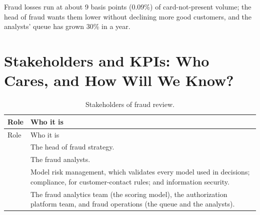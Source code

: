 Fraud losses run at about 9 basis points (0.09\%) of card-not-present volume; the head of fraud wants them lower without declining more good customers, and the analysts' queue has grown 30\% in a year.

\section{Stakeholders and KPIs: Who Cares, and How Will We Know?}
\label{sec:fr-kpis}

\begingroup
\small
\begin{xltabular}{\textwidth}{@{}>{\raggedright\arraybackslash}p{2.0cm}>{\raggedright\arraybackslash}X@{}}
\caption{Stakeholders of fraud review.}\label{tab:fr-stakeholders}\\
\toprule
{} Role & Who it is \\
\midrule
\endfirsthead
\toprule
{} Role & Who it is \\
\midrule
\endhead
{} & The head of fraud strategy. \\
 & The fraud analysts. \\
 & Model risk management, which validates every model used in decisions; compliance, for customer-contact rules; and information security. \\
 & The fraud analytics team (the scoring model), the authorization platform team, and fraud operations (the queue and the analysts). \\
\bottomrule
\end{xltabular}
\endgroup

